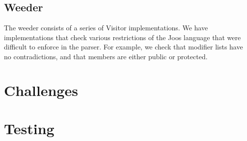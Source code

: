 \documentclass[12pt, titlepage]{article}
\begin{document}
\subsection{Weeder}
The weeder consists of a series of Visitor implementations. We have
implementations that check various restrictions of the Joos language that were
difficult to enforce in the parser. For example, we check that modifier lists
have no contradictions, and that members are either public or protected.

\section{Challenges}

\section{Testing}
\end{document}

